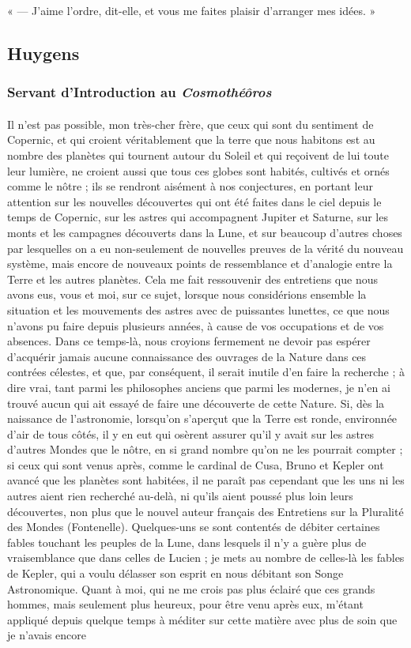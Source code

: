\documentclass[a4paper, 11pt, oneside, landscape]{article}
\begin{document}
« --- J'aime l'ordre, dit-elle, et vous me faites plaisir d'arranger mes idées. »
\clearpage
\subsection{Huygens}
\subsubsection{Servant d'Introduction au \emph{Cosmothéôros}}
\paragraph{}
Il n'est pas possible, mon très-cher frère, que ceux qui sont du sentiment de Copernic, et qui croient véritablement que la terre que nous habitons est au nombre des planètes qui tournent autour du Soleil et qui reçoivent de lui toute leur lumière, ne croient aussi que tous ces globes sont habités, cultivés et ornés comme le nôtre ; ils se rendront aisément à nos conjectures, en portant leur attention sur les nouvelles découvertes qui ont été faites dans le ciel depuis le temps de Copernic, sur les astres qui accompagnent Jupiter et Saturne, sur les monts et les campagnes découverts dans la Lune, et sur beaucoup d'autres choses par lesquelles on a eu non-seulement de nouvelles preuves de la vérité du nouveau système, mais encore de nouveaux points de ressemblance et d'analogie entre la Terre et les autres planètes. Cela me fait ressouvenir des entretiens que nous avons eus, vous et moi, sur ce sujet, lorsque nous considérions ensemble la situation et les mouvements des astres avec de puissantes lunettes, ce que nous n'avons pu faire depuis plusieurs années, à cause de vos occupations et de vos absences. Dans ce temps-là, nous croyions fermement ne devoir pas espérer d'acquérir jamais aucune connaissance des ouvrages de la Nature dans ces contrées célestes, et que, par conséquent, il serait inutile d'en faire la recherche ; à dire vrai, tant parmi les philosophes anciens que parmi les modernes, je n'en ai trouvé aucun qui ait essayé de faire une découverte de cette Nature. Si, dès la naissance de l'astronomie, lorsqu'on s'aperçut que la Terre est ronde, environnée d'air de tous côtés, il y en eut qui osèrent assurer qu'il y avait sur les astres d'autres Mondes que le nôtre, en si grand nombre qu'on ne les pourrait compter ; si ceux qui sont venus après, comme le cardinal de Cusa, Bruno et Kepler ont avancé que les planètes sont habitées, il ne paraît pas cependant que les uns ni les autres aient rien recherché au-delà, ni qu'ils aient poussé plus loin leurs découvertes, non plus que le nouvel auteur français des Entretiens sur la Pluralité des Mondes (Fontenelle). Quelques-uns se sont contentés de débiter certaines fables touchant les peuples de la Lune, dans lesquels il n'y a guère plus de vraisemblance que dans celles de Lucien ; je mets au nombre de celles-là les fables de Kepler, qui a voulu délasser son esprit en nous débitant son Songe Astronomique. Quant à moi, qui ne me crois pas plus éclairé que ces grands hommes, mais seulement plus heureux, pour être venu après eux, m'étant appliqué depuis quelque temps à méditer sur cette matière avec plus de soin que je n'avais encore 
\end{document}
